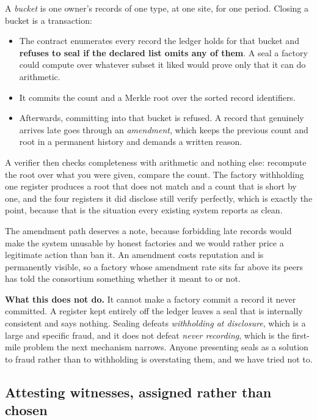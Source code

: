 \documentclass[11pt,a4paper]{article}
\begin{document}
A \emph{bucket} is one owner's records of one type, at one site, for one period.
Closing a bucket is a transaction:

\begin{itemize}[leftmargin=1.4em,itemsep=0.15em]
\item The contract enumerates every record the ledger holds for that bucket and
      \textbf{refuses to seal if the declared list omits any of them}. A seal a
      factory could compute over whatever subset it liked would prove only that
      it can do arithmetic.
\item It commits the count and a Merkle root over the sorted record identifiers.
\item Afterwards, committing into that bucket is refused. A record that genuinely
      arrives late goes through an \emph{amendment}, which keeps the previous
      count and root in a permanent history and demands a written reason.
\end{itemize}

A verifier then checks completeness with arithmetic and nothing else: recompute
the root over what you were given, compare the count. The factory withholding one
register produces a root that does not match and a count that is short by one,
and the four registers it did disclose still verify perfectly, which is
exactly the point, because that is the situation every existing system reports as
clean.

The amendment path deserves a note, because forbidding late records would make
the system unusable by honest factories and we would rather price a legitimate
action than ban it. An amendment costs reputation and is permanently visible, so
a factory whose amendment rate sits far above its peers has told the consortium
something whether it meant to or not.

\textbf{What this does not do.} It cannot make a factory commit a record it never
committed. A register kept entirely off the ledger leaves a seal that is
internally consistent and says nothing. Sealing defeats \emph{withholding at
disclosure}, which is a large and specific fraud, and it does not defeat
\emph{never recording}, which is the first-mile problem the next mechanism
narrows. Anyone presenting seals as a solution to fraud rather than to
withholding is overstating them, and we have tried not to.

\subsection{Attesting witnesses, assigned rather than chosen}
\label{sec:witness}
\end{document}
